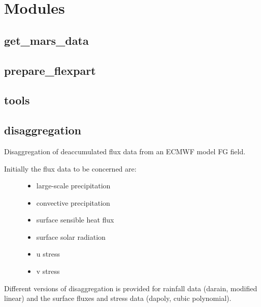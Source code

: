 \documentclass[letterpaper,10pt,english]{sphinxmanual}
\begin{document}
\section{Modules}
\label{\detokenize{api:modules}}

\subsection{get\_mars\_data}
\label{\detokenize{api:get-mars-data}}

\subsection{prepare\_flexpart}
\label{\detokenize{api:prepare-flexpart}}

\subsection{tools}
\label{\detokenize{api:tools}}

\subsection{disaggregation}
\label{\detokenize{api:module-disaggregation}}\label{\detokenize{api:disaggregation}}
Disaggregation of deaccumulated flux data from an ECMWF model FG field.
\begin{description}
\item[{Initially the flux data to be concerned are:}] \leavevmode\begin{itemize}
\item {} 
large-scale precipitation

\item {} 
convective precipitation

\item {} 
surface sensible heat flux

\item {} 
surface solar radiation

\item {} 
u stress

\item {} 
v stress

\end{itemize}

\end{description}

Different versions of disaggregation is provided for rainfall
data (darain, modified linear) and the surface fluxes and
stress data (dapoly, cubic polynomial).
\end{document}
